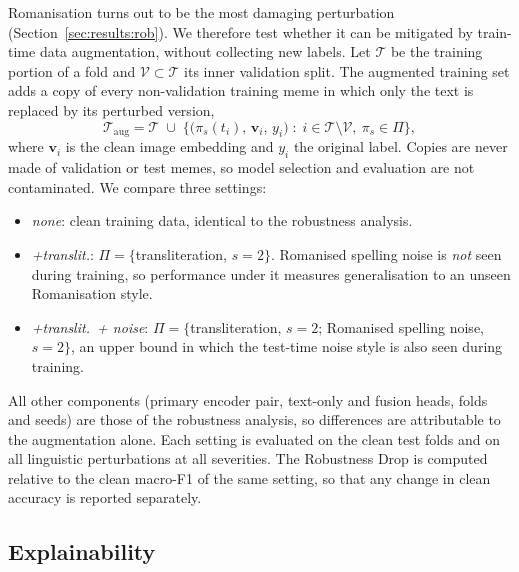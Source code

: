 Romanisation turns out to be the most damaging perturbation (Section~\ref{sec:results:rob}). We therefore test
whether it can be mitigated by train-time data augmentation, without collecting new labels. Let $\mathcal{T}$ be the
training portion of a fold and $\mathcal{V}\subset\mathcal{T}$ its inner validation split. The augmented training
set adds a copy of every non-validation training meme in which only the text is replaced by its perturbed version,
\begin{equation}
\mathcal{T}_{\text{aug}}=\mathcal{T}\;\cup\;\big\{\big(\pi_{s}(t_i),\,\mathbf{v}_i,\,y_i\big)
\;:\; i\in\mathcal{T}\setminus\mathcal{V},\ \pi_s\in\Pi\big\},
\end{equation}
where $\mathbf{v}_i$ is the clean image embedding and $y_i$ the original label. Copies are never made of validation
or test memes, so model selection and evaluation are not contaminated. We compare three settings:
\begin{itemize}
  \item \emph{none}: clean training data, identical to the robustness analysis.
  \item \emph{+translit.}: $\Pi=\{$transliteration, $s=2\}$. Romanised spelling noise is \emph{not} seen during
  training, so performance under it measures generalisation to an unseen Romanisation style.
  \item \emph{+translit.\ + noise}: $\Pi=\{$transliteration, $s=2$; Romanised spelling noise, $s=2\}$, an upper
  bound in which the test-time noise style is also seen during training.
\end{itemize}
All other components (primary encoder pair, text-only and fusion heads, folds and seeds) are those of the
robustness analysis, so differences are attributable to the augmentation alone. Each setting is evaluated on the
clean test folds and on all linguistic perturbations at all severities. The Robustness Drop is computed relative to
the clean macro-F1 of the same setting, so that any change in clean accuracy is reported separately.

\subsection{Explainability}
\label{sec:method:xai}

